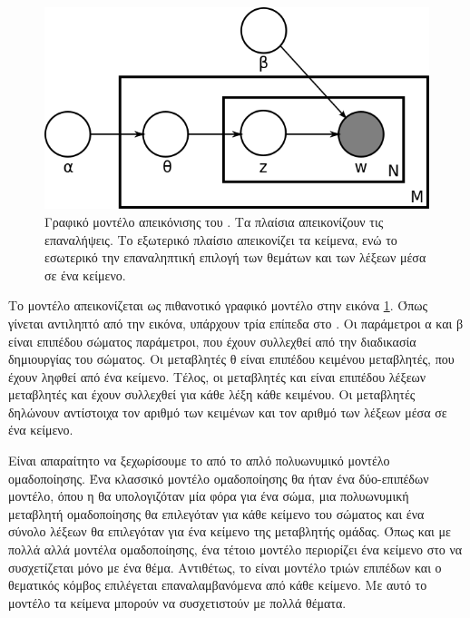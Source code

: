 {{{{{{{{\begin{figure}[!ht] \centering
\centerline{
    \includegraphics[scale=0.45]{static/figures/ldamodel2.png}}
    \caption{Γραφικό μοντέλο απεικόνισης του {}. Τα πλαίσια απεικονίζουν τις επαναλήψεις. 
    Το εξωτερικό πλαίσιο απεικονίζει τα κείμενα, ενώ το εσωτερικό την επαναληπτική επιλογή των θεμάτων 
    και των λέξεων μέσα σε ένα κείμενο.}
    \label{fig:ldamodel02}
\end{figure}

Το {} μοντέλο απεικονίζεται ως πιθανοτικό γραφικό μοντέλο στην εικόνα \ref{fig:ldamodel02}. 
Όπως γίνεται αντιληπτό από την εικόνα, υπάρχουν τρία επίπεδα στο {}. 
Οι παράμετροι α και β είναι επιπέδου σώματος παράμετροι, που έχουν συλλεχθεί 
από την διαδικασία δημιουργίας του σώματος. 
Οι μεταβλητές θ είναι επιπέδου κειμένου μεταβλητές, που έχουν ληφθεί από ένα κείμενο. 
Τέλος, οι μεταβλητές {} και {} είναι επιπέδου λέξεων μεταβλητές και έχουν συλλεχθεί για κάθε λέξη κάθε κειμένου. 
Οι μεταβλητές {} δηλώνουν αντίστοιχα τον αριθμό των κειμένων και τον αριθμό των λέξεων μέσα σε ένα κείμενο.

Είναι απαραίτητο να ξεχωρίσουμε το {} από το απλό {} πολυωνυμικό μοντέλο ομαδοποίησης. 
Ένα κλασσικό μοντέλο ομαδοποίησης θα ήταν ένα δύο-επιπέδων μοντέλο, 
όπου η {} θα υπολογιζόταν μία φόρα για ένα σώμα, μια πολυωνυμική μεταβλητή
ομαδοποίησης θα επιλεγόταν για κάθε κείμενο του σώματος και ένα σύνολο λέξεων
θα επιλεγόταν για ένα κείμενο της μεταβλητής ομάδας. Όπως και με πολλά αλλά μοντέλα
ομαδοποίησης, ένα τέτοιο μοντέλο περιορίζει ένα κείμενο στο να συσχετίζεται μόνο με ένα θέμα. 
Αντιθέτως, το {} είναι μοντέλο τριών επιπέδων και ο θεματικός κόμβος επιλέγεται επαναλαμβανόμενα από κάθε κείμενο. 
Με αυτό το μοντέλο τα κείμενα μπορούν να συσχετιστούν με πολλά θέματα. \\

}}}}}}}}
